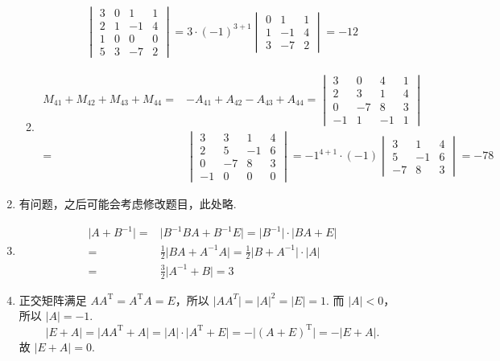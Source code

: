 \begin{enumerate}
\begin{enumerate}
\begin{align*}
\begin{vmatrix}
                3 & 0 & 1 & 1 \\
                2 & 1 & -1 & 4 \\
                1 & 0 & 0 & 0 \\
                5 & 3 & -7 & 2
            \end{vmatrix} = 3 \cdot (-1)^{3+1} \begin{vmatrix}
                0 & 1 & 1 \\
                1 & -1 & 4 \\
                3 & -7 & 2
            \end{vmatrix} = -12
        \end{align*}
        \item \begin{align*}
            M_{41}+M_{42}+M_{43}+M_{44} ={} & -A_{41}+A_{42}-A_{43}+A_{44} = \begin{vmatrix}
                3 & 0 & 4 & 1 \\
                2 & 3 & 1 & 4 \\
                0 & -7 & 8 & 3 \\
                -1 & 1 & -1 & 1
            \end{vmatrix} \\ ={} & \begin{vmatrix}
                3 & 3 & 1 & 4 \\
                2 & 5 & -1 & 6 \\
                0 & -7 & 8 & 3 \\
                -1 & 0 & 0 & 0
            \end{vmatrix} = {-1}^{4+1} \cdot (-1) \begin{vmatrix}
                3 & 1 & 4 \\
                5 & -1 & 6 \\
                -7 & 8 & 3
            \end{vmatrix} = -78
        \end{align*}
    \end{enumerate}
    \item 有问题，之后可能会考虑修改题目，此处略.
    \item \begin{align*}
        \lvert A+B^{-1} \rvert ={} & \lvert B^{-1}BA+B^{-1}E \rvert = \lvert B^{-1} \rvert \cdot \lvert BA+E \rvert \\ ={} & \frac{1}{2} \lvert BA+A^{-1}A \rvert = \frac{1}{2} \lvert B+A^{-1} \rvert \cdot \lvert A \rvert \\ ={} & \frac{3}{2} \lvert A^{-1}+B \rvert = 3
    \end{align*}
    \item 正交矩阵满足 $AA^{\mathrm{T}} = A^{\mathrm{T}}A = E$，所以 $\lvert AA^{T} \rvert = \lvert A \rvert^2 = \lvert E \rvert = 1$. 而 $\lvert A \rvert < 0$，所以 $\lvert A \rvert = -1$.
    \[\lvert E+A \rvert = \lvert AA^{\mathrm{T}}+A \rvert = \lvert A \rvert \cdot \lvert A^{\mathrm{T}}+E \rvert = -\lvert (A+E)^{\mathrm{T}} \rvert = -\lvert E+A \rvert.\]
    故 $\lvert E+A \rvert = 0$.


\end{enumerate}
